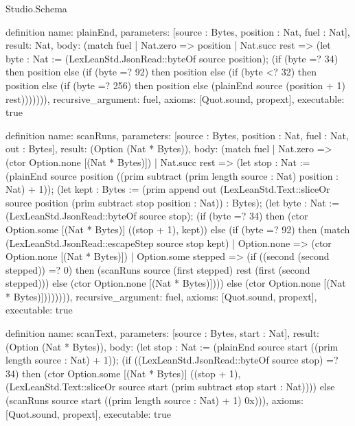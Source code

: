 \begin{lexlean}{Studio.Schema}
\begin{semanticmodule}
definition{
  name: plainEnd,
  parameters: [source : Bytes, position : Nat, fuel : Nat],
  result: Nat,
  body: (match fuel
    | Nat.zero => position
    | Nat.succ rest => (let byte : Nat := (LexLeanStd.JsonRead::byteOf source position); (if (byte =? 34) then position else (if (byte =? 92) then position else (if (byte <? 32) then position else (if (byte =? 256) then position else (plainEnd source (position + 1) rest))))))),
  recursive_argument: fuel,
  axioms: [Quot.sound, propext],
  executable: true
}

definition{
  name: scanRuns,
  parameters: [source : Bytes, position : Nat, fuel : Nat, out : Bytes],
  result: (Option (Nat * Bytes)),
  body: (match fuel
    | Nat.zero => (ctor Option.none [(Nat * Bytes)])
    | Nat.succ rest => (let stop : Nat := (plainEnd source position ((prim subtract (prim length source : Nat) position : Nat) + 1)); (let kept : Bytes := (prim append out (LexLeanStd.Text::sliceOr source position (prim subtract stop position : Nat)) : Bytes); (let byte : Nat := (LexLeanStd.JsonRead::byteOf source stop); (if (byte =? 34) then (ctor Option.some [(Nat * Bytes)] ((stop + 1), kept)) else (if (byte =? 92) then (match (LexLeanStd.JsonRead::escapeStep source stop kept)
      | Option.none => (ctor Option.none [(Nat * Bytes)])
      | Option.some stepped => (if ((second (second stepped)) =? 0) then (scanRuns source (first stepped) rest (first (second stepped))) else (ctor Option.none [(Nat * Bytes)]))) else (ctor Option.none [(Nat * Bytes)]))))))),
  recursive_argument: fuel,
  axioms: [Quot.sound, propext],
  executable: true
}

definition{
  name: scanText,
  parameters: [source : Bytes, start : Nat],
  result: (Option (Nat * Bytes)),
  body: (let stop : Nat := (plainEnd source start ((prim length source : Nat) + 1)); (if ((LexLeanStd.JsonRead::byteOf source stop) =? 34) then (ctor Option.some [(Nat * Bytes)] ((stop + 1), (LexLeanStd.Text::sliceOr source start (prim subtract stop start : Nat)))) else (scanRuns source start ((prim length source : Nat) + 1) 0x))),
  axioms: [Quot.sound, propext],
  executable: true
}


\end{semanticmodule}
\end{lexlean}
